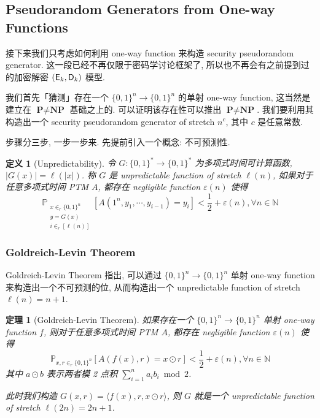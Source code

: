 \documentclass[8pt]{article}
\theoremstyle{compact}
\newtheorem{theorem}{定理}[section]
\newtheorem{definition}{定义}[section]
\def\P{\textbf{P}}
\def\NP{\textbf{NP}}
\begin{document}
\subsection{Pseudorandom Generators from One-way Functions}

接下来我们只考虑如何利用 one-way function 来构造 security pseudorandom generator. 这一段已经不再仅限于密码学讨论框架了, 所以也不再会有之前提到过的加密解密 $(\textsf E_k, \textsf D_k)$ 模型.

我们首先「猜测」存在一个 $\{0, 1\}^n \to \{0, 1\}^n$ 的单射 one-way function, 这当然是建立在 $\P \neq \NP$ 基础之上的. 可以证明该存在性可以推出 $\P \neq \NP$. 我们要利用其构造出一个 security pseudorandom generator of stretch $n^c$, 其中 $c$ 是任意常数.

步骤分三步, 一步一步来. 先提前引入一个概念: 不可预测性.

\begin{definition}[Unpredictability]
	令 $G: \{0, 1\}^* \to \{0, 1\}^*$ 为多项式时间可计算函数, $|G(x)| = \ell(|x|)$. 称 $G$ 是 unpredictable function of stretch $\ell(n)$, 如果对于任意多项式时间 PTM $A$, 都存在 negligible function $\varepsilon(n)$ 使得 $$\mathbb P_{\substack{x \in_r \{0, 1\}^n \\ y = G(x) \\ i \in_r [\ell(n)]}}[A(1^n, y_1, \cdots, y_{i-1}) = y_i] < \frac12 + \varepsilon(n), \forall n \in \mathbb N$$
\end{definition}

\subsubsection{Goldreich-Levin Theorem}

Goldreich-Levin Theorem 指出, 可以通过 $\{0, 1\}^n \to \{0, 1\}^n$ 单射 one-way function 来构造出一个不可预测的位, 从而构造出一个 unpredictable function of stretch $\ell(n) = n + 1$.

\begin{theorem}[Goldreich-Levin Theorem]
	如果存在一个 $\{0, 1\}^n \to \{0, 1\}^n$ 单射 one-way function $f$, 则对于任意多项式时间 PTM $A$, 都存在 negligible function $\varepsilon(n)$ 使得 $$\mathbb P_{x, r \in_r \{0, 1\}^n }[A(f(x), r) = x \odot r] < \frac12 + \varepsilon(n), \forall n \in \mathbb N$$ 其中 $a \odot b$ 表示两者模 2 点积 $\sum_{i=1}^{n}a_ib_i \bmod 2$.
	\label{Goldreich-Levin}
\end{theorem}

\textit{此时我们构造 $G(x, r) = \langle f(x), r, x \odot r \rangle$, 则 $G$ 就是一个 unpredictable function of stretch $\ell(2n) = 2n + 1$.}
\end{document}
